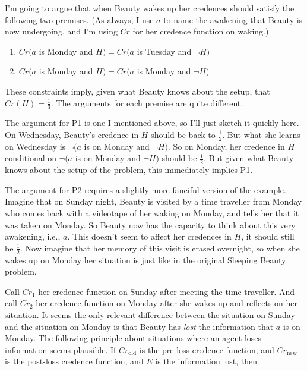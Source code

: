 I'm going to argue that when Beauty wakes up her credences should satisfy the following two premises. (As always, I use \(a\) to name the awakening that Beauty is now undergoing, and I'm using \(Cr\) for her credence function on waking.)

\renewcommand{\labelenumi}{P\arabic{enumi}:}
\begin{enumerate}
\item \(Cr(a\) is Monday and \(H) = Cr(a\) is Tuesday and \(\neg H)\)
\item \(Cr(a\) is Monday and \(H) = Cr(a\) is Monday and \(\neg H)\)
\end{enumerate}

\noindent These constraints imply, given what Beauty knows about the setup, that \(Cr(H) = \frac{1}{3}\). The arguments for each premise are quite different.

The argument for P1 is one I mentioned above, so I'll just sketch it quickly here. On Wednesday, Beauty's credence in \(H\) should be back to \(\frac{1}{2}\). But what she learns on Wednesday is \(\neg (a\) is on Monday and \(\neg H)\). So on Monday, her credence in \(H\) conditional on \(\neg (a\) is on Monday and \(\neg H)\) should be \(\frac{1}{2}\). But given what Beauty knows about the setup of the problem, this immediately implies P1.

The argument for P2 requires a slightly more fanciful version of the example. Imagine that on Sunday night, Beauty is visited by a time traveller from Monday who comes back with a videotape of her waking on Monday, and tells her that it was taken on Monday. So Beauty now has the capacity to think about this very awakening, i.e., \(a\). This doesn't seem to affect her credences in \(H\), it should still be \(\frac{1}{2}\). Now imagine that her memory of this visit is erased overnight, so when she wakes up on Monday her situation is just like in the original Sleeping Beauty problem.

Call \(Cr_1\) her credence function on Sunday after meeting the time traveller. And call \(Cr_2\) her credence function on Monday after she wakes up and reflects on her situation. It seems the only relevant difference between the situation on Sunday and the situation on Monday is that Beauty has \textit{lost} the information that \(a\) is on Monday. The following principle about situations where an agent loses information seems plausible. If \(Cr_{\text{old}}\) is the pre-loss credence function, and \(Cr_{\text{new}}\) is the post-loss credence function, and \(E\) is the information lost, then

